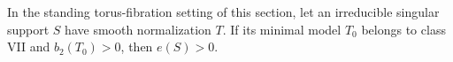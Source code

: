 
\begin{proposition}[P4.23]\hypertarget{tag-02WV}{}\label{night:P4.23}\label{stmt:P4.23}


In the standing torus-fibration setting of this section, let an irreducible singular support
$S$ have smooth normalization $T$. If its minimal model $T_0$
belongs to class VII and $b_2(T_0)>0$, then $e(S)>0$.
\end{proposition}

